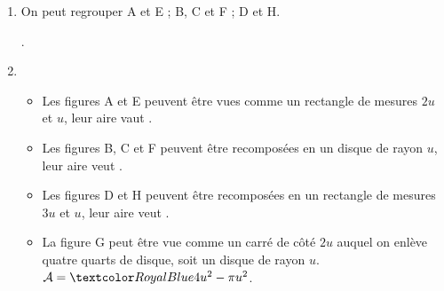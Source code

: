 \begin{Maquette}[Fiche,CorrigeFin,Colonnes=2]{}
\begin{multicols}{2}
         \begin{Solution}
            \begin{enumerate}
               \item On peut regrouper A et E ; B, C et F ; D et H. \par
                  .
               \item 
                  \begin{itemize}
                     \item Les figures A et E peuvent être vues comme un rectangle de mesures $2u$ et $u$, leur aire vaut .
                     \item Les figures B, C et F peuvent être recomposées en un disque de rayon $u$, leur aire veut .
                     \item Les figures D et H peuvent être recomposées en un rectangle de mesures $3u$ et $u$, leur aire veut .
                     \item La figure G peut être vue comme un carré de côté $2u$ auquel on enlève quatre quarts de disque, soit un disque de rayon $u$. $\mathcal{A} =\cor{4u^2-\pi u^2}$.
                  \end{itemize}
            \end{enumerate}
         \end{Solution}
         

\end{multicols}
\end{Maquette}
